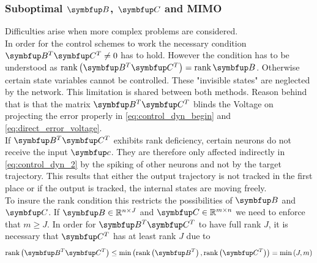 \subsubsection{Suboptimal $\bmu{B}$, $\bmu{C}$ and \ac{MIMO}}
Difficulties arise when more complex problems are considered.\\
In order for the control schemes to work the necessary condition $\bmu{B}^T\bmu{C}^T \neq 0$\cite{huang_dynamics_2019} has to hold. However the condition has to be understood as $\rank\left(\bmu{B}^T\bmu{C}^T\right) = \rank{\bmu{B}}$. Otherwise certain state variables cannot be controlled. These "invisible states" are neglected by the network. This limitation is shared between both methods. Reason behind that is
that the matrix $\bmu{B}^T\bmu{C}^T$ blinds the Voltage on projecting the error properly in \cref{eq:control_dyn_begin} and \cref{eq:direct_error_voltage}.\\
If $\bmu{B}^T\bmu{C}^T$ exhibits rank deficiency, certain neurons do not receive the input $\bmu{c}$. They are therefore only affected indirectly in \cref{eq:control_dyn_2} by the spiking of other neurons and not by the target trajectory. This results that either the output trajectory is not tracked in the first place or if the output is tracked, the internal states are moving freely.\\
To insure the rank condition this restricts the possibilities of $\bmu{B}$ and $\bmu{C}$.
If $\bmu{B} \in \mathbb{R}^{n\times J}$ and $\bmu{C} \in \mathbb{R}^{m\times n}$ we need to enforce that $m\geq J$. In order for $\bmu{B}^T\bmu{C}^T$ to have full rank $J$, it is necessary that $\bmu{C}^T$ has at least rank $J$ due to
\begin{equation}
	\rank\left(\bmu{B}^T\bmu{C}^T\right) \leq \min\left(\rank\left(\bmu{B}^T\right),\rank\left(\bmu{C}^T\right)\right) = \min\left(J,m\right)
\end{equation}

